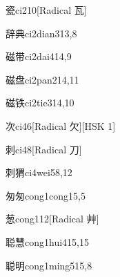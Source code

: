 \begin{entry}{瓷}{ci2}{10}[Radical ⽡]
\end{entry}

\begin{entry}{辞典}{ci2dian3}{13,8}
\end{entry}

\begin{entry}{磁带}{ci2dai4}{14,9}
\end{entry}

\begin{entry}{磁盘}{ci2pan2}{14,11}
\end{entry}

\begin{entry}{磁铁}{ci2tie3}{14,10}
\end{entry}

\begin{entry}{次}{ci4}{6}[Radical ⽋][HSK 1]
\end{entry}

\begin{entry}{刺}{ci4}{8}[Radical 刀]
\end{entry}

\begin{entry}{刺猬}{ci4wei5}{8,12}
\end{entry}

\begin{entry}{匆匆}{cong1cong1}{5,5}
\end{entry}

\begin{entry}{葱}{cong1}{12}[Radical 艸]
\end{entry}

\begin{entry}{聪慧}{cong1hui4}{15,15}
\end{entry}

\begin{entry}{聪明}{cong1ming5}{15,8}
\end{entry}

